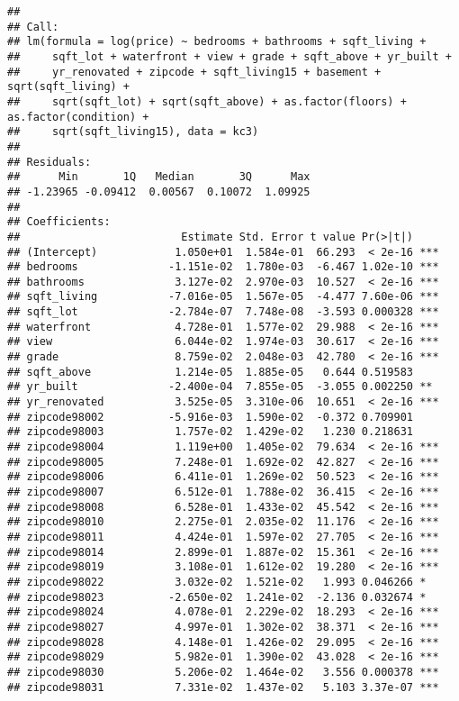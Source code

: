 \documentclass[]{article}
\begin{document}
\begin{verbatim}
## 
## Call:
## lm(formula = log(price) ~ bedrooms + bathrooms + sqft_living + 
##     sqft_lot + waterfront + view + grade + sqft_above + yr_built + 
##     yr_renovated + zipcode + sqft_living15 + basement + sqrt(sqft_living) + 
##     sqrt(sqft_lot) + sqrt(sqft_above) + as.factor(floors) + as.factor(condition) + 
##     sqrt(sqft_living15), data = kc3)
## 
## Residuals:
##      Min       1Q   Median       3Q      Max 
## -1.23965 -0.09412  0.00567  0.10072  1.09925 
## 
## Coefficients:
##                         Estimate Std. Error t value Pr(>|t|)    
## (Intercept)            1.050e+01  1.584e-01  66.293  < 2e-16 ***
## bedrooms              -1.151e-02  1.780e-03  -6.467 1.02e-10 ***
## bathrooms              3.127e-02  2.970e-03  10.527  < 2e-16 ***
## sqft_living           -7.016e-05  1.567e-05  -4.477 7.60e-06 ***
## sqft_lot              -2.784e-07  7.748e-08  -3.593 0.000328 ***
## waterfront             4.728e-01  1.577e-02  29.988  < 2e-16 ***
## view                   6.044e-02  1.974e-03  30.617  < 2e-16 ***
## grade                  8.759e-02  2.048e-03  42.780  < 2e-16 ***
## sqft_above             1.214e-05  1.885e-05   0.644 0.519583    
## yr_built              -2.400e-04  7.855e-05  -3.055 0.002250 ** 
## yr_renovated           3.525e-05  3.310e-06  10.651  < 2e-16 ***
## zipcode98002          -5.916e-03  1.590e-02  -0.372 0.709901    
## zipcode98003           1.757e-02  1.429e-02   1.230 0.218631    
## zipcode98004           1.119e+00  1.405e-02  79.634  < 2e-16 ***
## zipcode98005           7.248e-01  1.692e-02  42.827  < 2e-16 ***
## zipcode98006           6.411e-01  1.269e-02  50.523  < 2e-16 ***
## zipcode98007           6.512e-01  1.788e-02  36.415  < 2e-16 ***
## zipcode98008           6.528e-01  1.433e-02  45.542  < 2e-16 ***
## zipcode98010           2.275e-01  2.035e-02  11.176  < 2e-16 ***
## zipcode98011           4.424e-01  1.597e-02  27.705  < 2e-16 ***
## zipcode98014           2.899e-01  1.887e-02  15.361  < 2e-16 ***
## zipcode98019           3.108e-01  1.612e-02  19.280  < 2e-16 ***
## zipcode98022           3.032e-02  1.521e-02   1.993 0.046266 *  
## zipcode98023          -2.650e-02  1.241e-02  -2.136 0.032674 *  
## zipcode98024           4.078e-01  2.229e-02  18.293  < 2e-16 ***
## zipcode98027           4.997e-01  1.302e-02  38.371  < 2e-16 ***
## zipcode98028           4.148e-01  1.426e-02  29.095  < 2e-16 ***
## zipcode98029           5.982e-01  1.390e-02  43.028  < 2e-16 ***
## zipcode98030           5.206e-02  1.464e-02   3.556 0.000378 ***
## zipcode98031           7.331e-02  1.437e-02   5.103 3.37e-07 ***

\end{verbatim}
\end{document}
